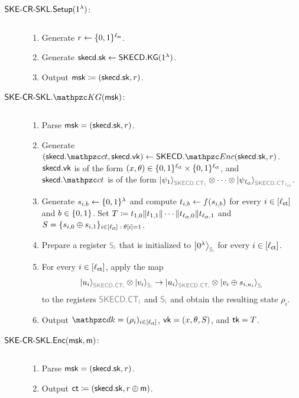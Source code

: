 \begin{description}

\item[$\mathsf{SKE}\textrm{-}\mathsf{CR}\textrm{-}\mathsf{SKL}.\mathsf{Setup}(1^\lambda)$:] $ $
\begin{enumerate}
    \item Generate $r\leftarrow\{0,1\}^{\ell_{\mathsf{m}}}$.
    \item Generate $\mathsf{skecd}.\mathsf{sk}\leftarrow\mathsf{SKECD}.\mathsf{KG}(1^\lambda)$.
    \item Output $\mathsf{msk}\coloneqq(\mathsf{skecd}.\mathsf{sk}, r)$.
\end{enumerate}

\item[$\SKECRSKL.\qKG(\msk)$:] $ $
\begin{enumerate}
    \item Parse $\mathsf{msk}=(\mathsf{skecd}.\mathsf{sk}, r)$.
    \item Generate
        $(\skecd.\qct,\skecd.\vk)\gets\SKECD.\qEnc(\skecd.\sk,r)$.
        $\mathsf{skecd}.\mathsf{vk}$ is of the form
        $(x,\theta)\in\{0,1\}^{\ell_{\mathsf{ct}}}\times\{0,1\}^{\ell_{\mathsf{ct}}}$, and
        $\skecd.\qct$ is of the form
        $\ket{\psi_1}_{\qreg{SKECD.CT_1}}\tensor\cdots\tensor\ket{\psi_{\ctlen}}_{\qreg{SKECD.CT_{\ctlen}}}$.

    \item Generate $s_{i,b}\leftarrow\{0,1\}^\lambda$ and compute $t_{i,b}\leftarrow f(s_{i,b})$ for every $i\in[\ell_{\mathsf{ct}}]$ and $b\in\{0,1\}$. 
    Set $T\coloneqq
    t_{1,0}\|t_{1,1}\|\cdots\|t_{\ell_{\mathsf{ct}},0}\|t_{\ell_{\mathsf{ct}},1}$ and $S =
    \{s_{i,0} \oplus s_{i, 1}\}_{i \in [\ell_{\mathsf{ct}}] \; : \;\theta[i] =
    1}$.
    \item Prepare a register $\qreg{S_i}$ that is initialized to
    $\ket{0^\secp}_{\qreg{S_i}}$ for every $i\in[\ell_{\mathsf{ct}}]$. 
    \item For every $i\in[\ell_{\mathsf{ct}}]$, apply the map
    \begin{align}
    \ket{u_i}_{\qreg{SKECD.CT_i}}\tensor\ket{v_i}_{\qreg{S_i}}
    \ra
    \ket{u_i}_{\qreg{SKECD.CT_i}}\tensor\ket{v_i\oplus s_{i,u_i}}_{\qreg{S_i}}
    \end{align}
    to the registers $\qreg{SKECD.CT_i}$ and $\qreg{S_i}$ and obtain the resulting state $\rho_i$.
    \item Output $\qdk = (\rho_i)_{i\in{[\ctlen]}}$,
    $\mathsf{vk}=(x,\theta,S)$, and $\mathsf{tk}=T$.
\end{enumerate}

\item[$\mathsf{SKE}\textrm{-}\mathsf{CR}\textrm{-}\mathsf{SKL}.\mathsf{Enc}(\mathsf{msk}, \mathsf{m})$:] $ $
\begin{enumerate}
    \item Parse $\mathsf{msk} = (\mathsf{skecd}.\mathsf{sk}, r)$.
    \item Output $\mathsf{ct}\coloneqq(\mathsf{skecd}.\mathsf{sk}, r\oplus\mathsf{m})$.
    

\end{enumerate}
\end{description}
